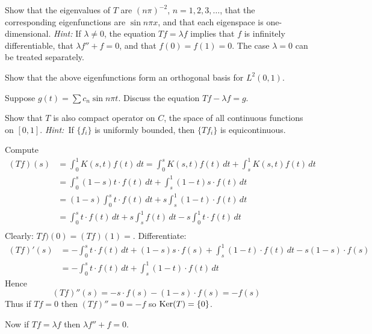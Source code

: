 \begin{enumerate}
\begin{excopy}
\begin{itemize}
Show that the eigenvalues of $T$ are \((n\pi)^{-2}\), \(n=1,2,3,\ldots\),
 that the corresponding
eigenfunctions are \(\sin n\pi x\), and that each eigenspace is one-dimensional.
\emph{Hint:} If
\(\lambda \neq 0\), the equation \(Tf = \lambda f\) implies that $f$ is
 infinitely differentiable, that \(\lambda f'' + f = 0\),
and that \(f(0) = f(1) = 0\).
 The case \(\lambda = 0\) can be treated separately.

Show that the above eigenfunctions form an orthogonal basis for \(L^2(0, 1)\).

Suppose \(g(t) = \sum c_n \sin n \pi t\).
 Discuss the equation \(Tf - \lambda f = g\).

Show that $T$ is also compact operator on $C$, the space of all continuous
functions
on \([0,1]\). 
 \emph{Hint:}~If \(\{f_i\}\) is uniformly bounded,
then \(\{Tf_i\}\) is equicontinuous.

\end{itemize}
\end{excopy}

\begin{itemize}
Compute
\begin{align*}
(Tf)(s)
&= \int_0^1 K(s,t)f(t)\,dt
 = \int_0^s K(s,t)f(t)\,dt + \int_s^1 K(s,t)f(t)\,dt \\
&= \int_0^s (1-s)t\cdot f(t)\,dt + \int_s^1 (1-t)s\cdot f(t)\,dt \\
&= (1-s)\int_0^s t\cdot f(t)\,dt + s\int_s^1 (1-t)\cdot f(t)\,dt \\
&= \int_0^s t\cdot f(t)\,dt + s\int_s^1 f(t)\,dt -s \int_0^1  t\cdot f(t)\,dt\\
\end{align*}
Clearly: \(Tf)(0) = (Tf)(1) = \).
Differentiate:
\begin{align*}
(Tf)'(s)
&= -\int_0^s t\cdot f(t)\,dt + (1-s)s\cdot f(s) + 
   \int_s^1 (1-t)\cdot f(t)\,dt - s(1-s)\cdot f(s) \\
&=  - \int_0^s t\cdot f(t)\,dt + \int_s^1 (1-t)\cdot f(t)\,dt
\end{align*}
Hence
\begin{equation*}
(Tf)''(s) = -s\cdot f(s) - (1 - s)\cdot f(s) = -f(s)
\end{equation*}
Thus if \(T f = 0\) then \((T f)'' = 0 = -f\) so \(\mathop{\rm Ker}\nolimits(T) = \{0\}\).

Now if \(T f = \lambda f\) then \(\lambda f'' + f = 0\).


\end{itemize}
\end{enumerate}
